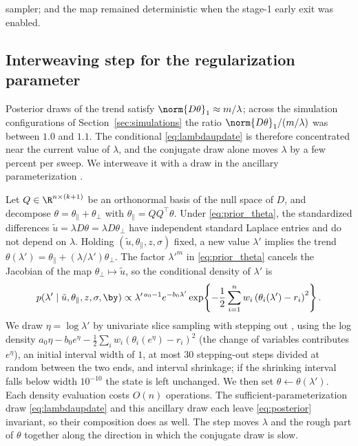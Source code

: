 sampler; and the map remained deterministic when the stage-1 early exit was enabled.

\subsection{Interweaving step for the regularization parameter}
\label{app:pmala:asis}

Posterior draws of the trend satisfy $\norm{D\theta}_1 \approx m/\lambda$; across the simulation configurations of Section~\ref{sec:simulations} the ratio $\norm{D\theta}_1/(m/\lambda)$ was between $1.0$ and $1.1$. The conditional \eqref{eq:lambdaupdate} is therefore concentrated near the current value of $\lambda$, and the conjugate draw alone moves $\lambda$ by a few percent per sweep. We interweave it with a draw in the ancillary parameterization \citep{yu2011center}.

Let $Q \in \R^{n\times(k+1)}$ be an orthonormal basis of the null space of $D$, and decompose $\theta = \theta_\parallel + \theta_\perp$ with $\theta_\parallel = QQ^\top\theta$. Under \eqref{eq:prior_theta}, the standardized differences $\tilde u = \lambda D\theta = \lambda D\theta_\perp$ have independent standard Laplace entries and do not depend on $\lambda$. Holding $(\tilde u, \theta_\parallel, z, \sigma)$ fixed, a new value $\lambda'$ implies the trend $\theta(\lambda') = \theta_\parallel + (\lambda/\lambda')\theta_\perp$. The factor $\lambda'^m$ in \eqref{eq:prior_theta} cancels the Jacobian of the map $\theta_\perp \mapsto \tilde u$, so the conditional density of $\lambda'$ is
\[
p(\lambda' \mid \tilde u, \theta_\parallel, z, \sigma, \by) \propto \lambda'^{\,a_0 - 1} e^{-b_0\lambda'} \exp\!\left\{-\frac12 \sum_{i=1}^n w_i\left(\theta_i(\lambda') - r_i\right)^2\right\}.
\]
We draw $\eta = \log\lambda'$ by univariate slice sampling with stepping out \citep{neal2003slice}, using the log density $a_0\eta - b_0 e^\eta - \frac12\sum_i w_i(\theta_i(e^\eta) - r_i)^2$ (the change of variables contributes $e^\eta$), an initial interval width of $1$, at most $30$ stepping-out steps divided at random between the two ends, and interval shrinkage; if the shrinking interval falls below width $10^{-10}$ the state is left unchanged. We then set $\theta \leftarrow \theta(\lambda')$. Each density evaluation costs $O(n)$ operations. The sufficient-parameterization draw \eqref{eq:lambdaupdate} and this ancillary draw each leave \eqref{eq:posterior} invariant, so their composition does as well. The step moves $\lambda$ and the rough part of $\theta$ together along the direction in which the conjugate draw is slow.

